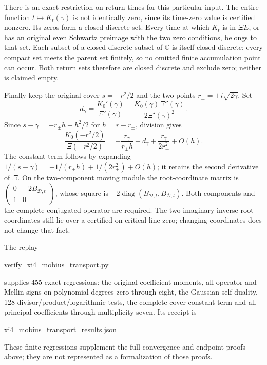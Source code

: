 There is an exact restriction on return times for this particular
input. The entire function $t\mapsto K_t(\gamma)$ is not identically
zero, since its time-zero value is certified nonzero. Its zeros form
a closed discrete set. Every time at which $K_t$ is in $\Xi E$,
or has an original even Schwartz preimage with the two zero
conditions, belongs to that set. Each subset of a closed discrete
subset of $\mathbb C$ is itself closed discrete: every compact set
meets the parent set finitely, so no omitted finite accumulation
point can occur. Both return sets therefore are closed discrete
and exclude zero; neither is claimed empty.

Finally keep the original cover $s=-r^2/2$ and the two points
$r_\pm=\pm i\sqrt{2\gamma}$. Set
\[
 d_\gamma=\frac{K_0'(\gamma)}{\Xi'(\gamma)}
           -\frac{K_0(\gamma)\Xi''(\gamma)}{2\Xi'(\gamma)^2}.
\]
Since $s-\gamma=-r_\pm h-h^2/2$ for $h=r-r_\pm$, division gives
\begin{equation}\label{eq:xm-cover}
 \frac{K_0(-r^2/2)}{\Xi(-r^2/2)}
 =-\frac{r_\gamma}{r_\pm h}
       +d_\gamma+\frac{r_\gamma}{2r_\pm^2}+O(h).
\end{equation}
The constant term follows by expanding
$1/(s-\gamma)=-1/(r_\pm h)+1/(2r_\pm^2)+O(h)$;
it retains the second derivative of $\Xi$.
On the two-component moving module the root-coordinate matrix is
$\left(\begin{smallmatrix}0&-2B_{\mathcal D,t}\\1&0\end{smallmatrix}\right)$,
whose square is $-2\operatorname{diag}(B_{\mathcal D,t},B_{\mathcal D,t})$.
Both components and the complete conjugated operator are required.
The two imaginary inverse-root coordinates still lie over a
certified on-critical-line zero; changing coordinates does not
change that fact.

The replay
\begin{center}\small\ttfamily verify\_xi4\_mobius\_transport.py\end{center}
supplies 455 exact regressions: the original coefficient moments, all
operator and Mellin signs on polynomial degrees zero through eight,
the Gaussian self-duality, 128 divisor/product/logarithmic tests,
the complete cover constant term and all principal coefficients
through multiplicity seven. Its receipt is
\begin{center}\small\ttfamily xi4\_mobius\_transport\_results.json\end{center}
These finite
regressions supplement the full convergence and endpoint proofs
above; they are not represented as a formalization of those proofs.

